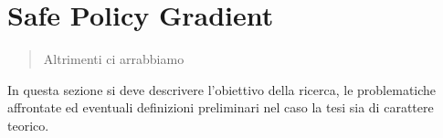 \chapter{Safe Policy Gradient}
\label{ch:safepg}
\thispagestyle{empty}

\begin{quotation}
{\footnotesize
{}
\begin{flushright}
Altrimenti ci arrabbiamo
\end{flushright}
}
\end{quotation}
\vspace{0.5cm}

\noindent In questa sezione si deve descrivere l'obiettivo della ricerca, le problematiche affrontate ed eventuali definizioni preliminari nel caso la tesi sia di carattere teorico.